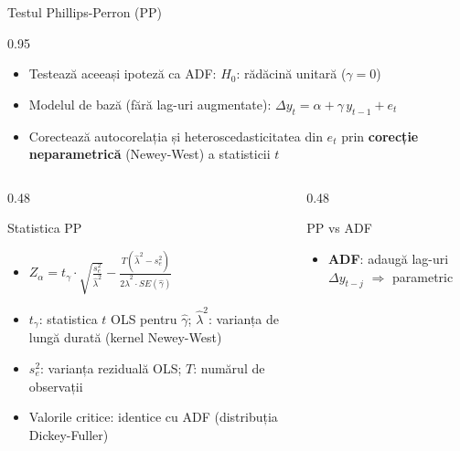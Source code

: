\documentclass[9pt, aspectratio=169, t]{beamer}
\begin{document}
\begin{frame}{Testul Phillips-Perron (PP)}
    \begin{cminipage}{0.95\textwidth}
        \small
        \begin{defn}
            \begin{itemize}\setlength{\itemsep}{0pt}
                \item Testează aceeași ipoteză ca ADF: $H_0$: rădăcină unitară ($\gamma = 0$)
                \item Modelul de bază (fără lag-uri augmentate): $\Delta y_t = \alpha + \gamma\, y_{t-1} + e_t$
                \item Corectează autocorelația și heteroscedasticitatea din $e_t$ prin \textbf{corecție neparametrică} (Newey-West) a statisticii $t$
            \end{itemize}
        \end{defn}
        \vspace{-0.2cm}
        \begin{columns}[T]
            \begin{column}{0.48\textwidth}
                \begin{block}{Statistica PP}
                    \begin{itemize}\setlength{\itemsep}{0pt}
                        \item $Z_\alpha = t_\gamma \cdot \sqrt{\frac{s_e^2}{\hat{\lambda}^2}} - \frac{T(\hat{\lambda}^2 - s_e^2)}{2\hat{\lambda}^2 \cdot SE(\hat{\gamma})}$
                        \item $t_\gamma$: statistica $t$ OLS pentru $\hat{\gamma}$; $\hat{\lambda}^2$: varianța de lungă durată (kernel Newey-West)
                        \item $s_e^2$: varianța reziduală OLS; $T$: numărul de observații
                        \item Valorile critice: identice cu ADF (distribuția Dickey-Fuller)
                    \end{itemize}
                \end{block}
            \end{column}
            \begin{column}{0.48\textwidth}
                \begin{exampleblock}{PP vs ADF}
                    \begin{itemize}\setlength{\itemsep}{0pt}
                        \item \textbf{ADF}: adaugă lag-uri $\Delta y_{t-j}$ $\Rightarrow$ parametric

\end{itemize}
\end{exampleblock}
\end{column}
\end{columns}
\end{cminipage}
\end{frame}
\end{document}
